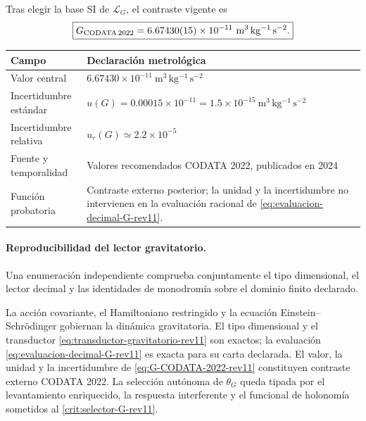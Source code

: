 Tras elegir la base SI de \(\mathcal L_G\), el contraste vigente es
\begin{equation}
 \boxed{
 G_{\rm CODATA\,2022}=6.67430(15)\times10^{-11}
 \ \mathrm{m^3\,kg^{-1}\,s^{-2}}.}
 \label{eq:G-CODATA-2022-rev11}
\end{equation}

\begin{center}
\begin{tabularx}{0.94\textwidth}{@{}L{0.27\textwidth}Y@{}}
\toprule
Campo & Declaración metrológica\\
\midrule
Valor central &
\(6.67430\times10^{-11}\ \mathrm{m^3\,kg^{-1}\,s^{-2}}\)\\
Incertidumbre estándar &
\(u(G)=0.00015\times10^{-11}
=1.5\times10^{-15}\ \mathrm{m^3\,kg^{-1}\,s^{-2}}\)\\
Incertidumbre relativa & \(u_r(G)\simeq2.2\times10^{-5}\)\\
Fuente y temporalidad &
Valores recomendados CODATA 2022, publicados en 2024
\cite{CODATA2022}\\
Función probatoria &
Contraste externo posterior; la unidad y la incertidumbre no intervienen en
la evaluación racional de \eqref{eq:evaluacion-decimal-G-rev11}.\\
\bottomrule
\end{tabularx}
\end{center}

\paragraph{Reproducibilidad del lector gravitatorio.}
Una enumeración independiente comprueba conjuntamente el tipo dimensional, el
lector decimal y las identidades de monodromía sobre el dominio finito
declarado.

\begin{proposition}
La acción covariante, el Hamiltoniano restringido y la ecuación
Einstein--Schrödinger gobiernan la dinámica gravitatoria. El tipo dimensional
y el transductor \eqref{eq:transductor-gravitatorio-rev11} son exactos; la
evaluación \eqref{eq:evaluacion-decimal-G-rev11} es exacta para su carta
declarada. El valor, la unidad y la incertidumbre de
\eqref{eq:G-CODATA-2022-rev11} constituyen contraste externo CODATA 2022. La
selección autónoma de \(\theta_G\) queda tipada por el levantamiento
enriquecido, la respuesta interferente y el funcional de holonomía sometidos
al \cref{crit:selector-G-rev11}.
\end{proposition}

